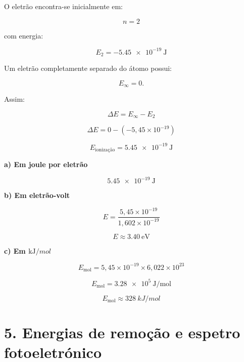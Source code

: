 \documentclass[11pt,a4paper]{article}
\begin{document}
	\begin{tcolorbox}[
		enhanced,
		breakable,
		colback=eulightorange,
		colframe=euorange,
		title=\textbf{Resolução do desafio -- Ionização a partir de \(n=2\)},
		fonttitle=\bfseries
		]
		
		O eletrão encontra-se inicialmente em:
		
		\[
		n=2
		\]
		
		com energia:
		
		\[
		E_2=\SI{-5,45e-19}{\joule}
		\]
		
		Um eletrão completamente separado do átomo possui:
		
		\[
		E_\infty=0.
		\]
		
		Assim:
		
		\[
		\Delta E
		=
		E_\infty-E_2
		\]
		
		\[
		\Delta E
		=
		0-(-5,45\times10^{-19})
		\]
		
		\[
		\boxed{
			E_{\text{ionização}}
			=
			\SI{5,45e-19}{\joule}
		}
		\]
		
		\textbf{a) Em joule por eletrão}
		
		\[
		\boxed{
			\SI{5,45e-19}{\joule}
		}
		\]
		
		\textbf{b) Em eletrão-volt}
		
		\[
		E=
		\frac{5,45\times10^{-19}}
		{1,602\times10^{-19}}
		\]
		
		\[
		\boxed{
			E\approx\SI{3,40}{\electronvolt}
		}
		\]
		
		\textbf{c) Em \(\si{\kilo\joule\per mol}\)}
		
		\[
		E_{\mathrm{mol}}
		=
		5,45\times10^{-19}
		\times6,022\times10^{23}
		\]
		
		\[
		E_{\mathrm{mol}}
		=
		\SI{3,28e5}{\joule\per\mole}
		\]
		
		\[
		\boxed{
			E_{\mathrm{mol}}
			\approx
			\SI{328}{kJ\per mol}
		}
		\]
		
	\end{tcolorbox}
	
	
	\newpage
	
	\section*{\textcolor{eublue}{5. Energias de remoção e espetro fotoeletrónico}}
	
\end{document}
